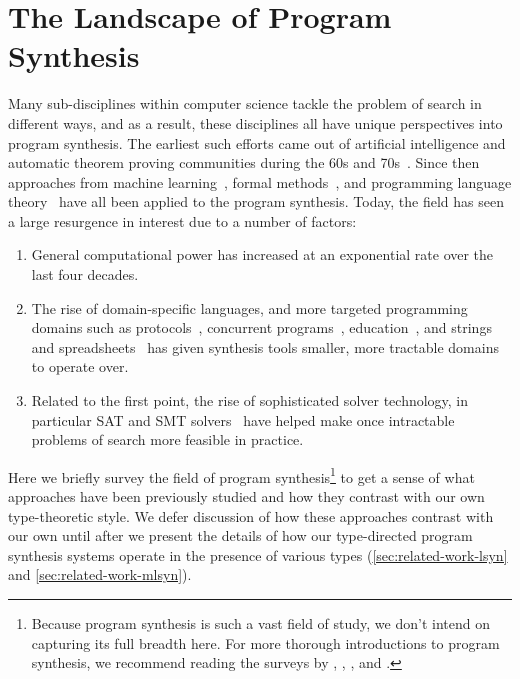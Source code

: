 \section{The Landscape of Program Synthesis}
\label{sec:the-landscape-of-program-synthesis}

Many sub-disciplines within computer science tackle the problem of search in different ways, and as a result, these disciplines all have unique perspectives into program synthesis.
The earliest such efforts came out of artificial intelligence and automatic theorem proving communities during the 60s and 70s~\citep{green-ijcai-1969, summers-popl-1976}.
Since then approaches from machine learning~\citep{lau-thesis-2001, briggs-kes-2008, weimer-icse-2009}, formal methods~\citep{srivastava-popl-2010, bodik-popl-2010, kuncak-pldi-2010}, and programming language theory~\citep{albarghouthi-cav-2013, gvero-pldi-2013, scherer-icfp-2015} have all been applied to the program synthesis.
Today, the field has seen a large resurgence in interest due to a number of factors:
\begin{enumerate}
  \item General computational power has increased at an exponential rate over the last four decades.~\citep{moore-electronics-1965}
  \item The rise of domain-specific languages, and more targeted programming domains such as protocols~\citep{alur-popl-2005, udupa-pldi-2013}, concurrent programs~\citep{solar-lezama-pldi-2008, cerny-cav-2011, prountzos-oopsla-2012}, education~\citep{singh-pldi-2013}, and strings and spreadsheets~\citep{gulwani-popl-2011} has given synthesis tools smaller, more tractable domains to operate over.
  \item Related to the first point, the rise of sophisticated solver technology, in particular SAT and SMT solvers~\citep{barrett-smt-2008} have helped make once intractable problems of search more feasible in practice.
\end{enumerate}
Here we briefly survey the field of program synthesis\footnote{%
  Because program synthesis is such a vast field of study, we don't intend on capturing its full breadth here.
  For more thorough introductions to program synthesis, we recommend reading the surveys by \citet{kreitz-automated-deduction-1998}, \citet{flener-jlp-1999}, \citet{gulwani-ppdp-2010}, and \citet{kitzelmann-aaip-2010}.
} to get a sense of what approaches have been previously studied and how they contrast with our own type-theoretic style.
We defer discussion of how these approaches contrast with our own until after we present the details of how our type-directed program synthesis systems operate in the presence of various types (\autoref{sec:related-work-lsyn} and \autoref{sec:related-work-mlsyn}).

